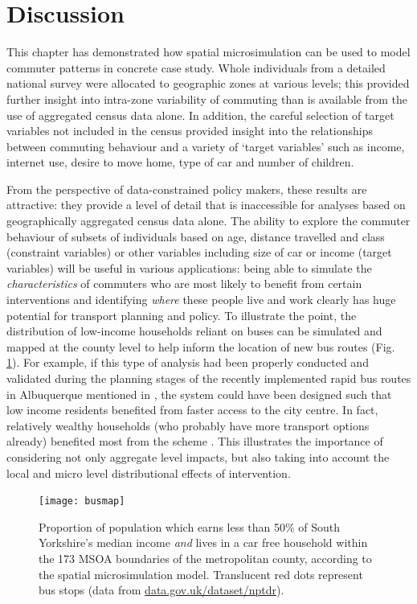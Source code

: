 \section{Discussion}
\label{discuss-jtrg}
This chapter has demonstrated how spatial microsimulation can be
used to model commuter patterns in concrete case study.
Whole individuals from a detailed national survey were
allocated to geographic zones at various levels; this provided further insight
into intra-zone variability of commuting than is available from the use of
aggregated census data alone. In addition, the careful selection of target
variables not included in the census provided insight into the relationships
between commuting behaviour and a variety of `target variables' such as income,
internet use, desire to move home, type of car and number of children.

From the perspective of data-constrained policy makers, these results are attractive:
they provide a level of detail that is inaccessible for analyses
based on geographically aggregated census data alone. The ability
to explore the commuter behaviour of subsets of individuals based on age,
distance travelled and class (constraint variables) or other variables
including size of car or income (target variables) will be useful in
various applications:
being able to simulate the \emph{characteristics} of commuters who are most
likely to benefit from certain interventions and identifying \emph{where} these
people live and work clearly has huge potential for transport planning and policy.
To illustrate the point, the
distribution of low-income households reliant on buses can be simulated and mapped
at the county level to help inform the location of new bus routes (Fig.
\ref{fig:busmap}). For example, if this type of analysis had been properly
conducted and validated during the planning stages of the recently implemented
rapid bus routes in Albuquerque mentioned in \citet{Tribby2012},
the system could have been
designed such that low income residents benefited from faster access to the city
centre. In fact, relatively wealthy households (who probably have more transport
options already) benefited most from the scheme \citep{Tribby2012}. This
illustrates the importance of considering not only aggregate level impacts, but
also taking into account the local and micro level distributional effects of
intervention.

\begin{figure}[h*]
 \centering
\texttt{[image: busmap]}
 \caption[Low-income car-free families and bus-stops in South Yorkshire]
 {Proportion of population which earns less than 50\% of South
Yorkshire's median income \emph{and} lives in a car free household within the 173 MSOA
boundaries of the metropolitan county, according to the spatial
microsimulation model. Translucent red dots represent bus
stops (data from {\color{blue}\href{http://data.gov.uk/dataset/nptdr}{data.gov.uk/dataset/nptdr}}).}
 \label{fig:busmap}
\end{figure}


